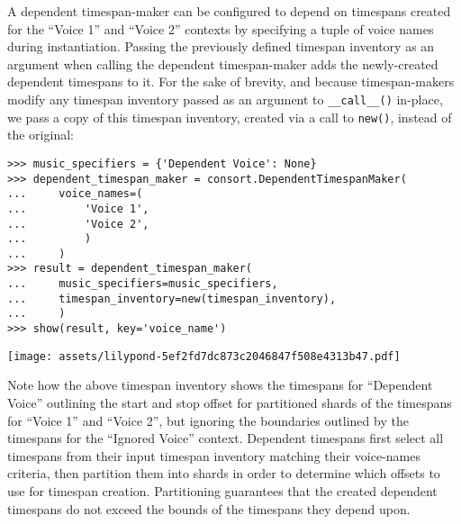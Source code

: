 \noindent A dependent timespan-maker can be configured to depend on timespans
created for the \enquote{Voice 1} and \enquote{Voice 2} contexts by specifying
a tuple of voice names during instantiation. Passing the previously defined
timespan inventory as an argument when calling the dependent timespan-maker
adds the newly-created dependent timespans to it. For the sake of brevity, and
because timespan-makers modify any timespan inventory passed as an argument to
\texttt{\_\_call\_\_()} in-place, we pass a copy of this timespan inventory,
created via a call to \texttt{new()}, instead of the original:

\begin{comment}
<abjad>
music_specifiers = {'Dependent Voice': None}
dependent_timespan_maker = consort.DependentTimespanMaker(
    voice_names=(
        'Voice 1',
        'Voice 2',
        )
    )
result = dependent_timespan_maker(
    music_specifiers=music_specifiers,
    timespan_inventory=new(timespan_inventory),
    )
show(result, key='voice_name')
</abjad>
\end{comment}

\begin{abjadbookoutput}
\begin{singlespacing}
\vspace{-0.5\baselineskip}
\begin{verbatim}
>>> music_specifiers = {'Dependent Voice': None}
>>> dependent_timespan_maker = consort.DependentTimespanMaker(
...     voice_names=(
...         'Voice 1',
...         'Voice 2',
...         )
...     )
>>> result = dependent_timespan_maker(
...     music_specifiers=music_specifiers,
...     timespan_inventory=new(timespan_inventory),
...     )
>>> show(result, key='voice_name')
\end{verbatim}
\noindent\texttt{[image: assets/lilypond-5ef2fd7dc873c2046847f508e4313b47.pdf]}
\end{singlespacing}
\end{abjadbookoutput}

\noindent Note how the above timespan inventory shows the timespans for
\enquote{Dependent Voice} outlining the start and stop offset for partitioned
shards of the timespans for \enquote{Voice 1} and \enquote{Voice 2}, but
ignoring the boundaries outlined by the timespans for the \enquote{Ignored
Voice} context. Dependent timespans first select all timespans from their input
timespan inventory matching their voice-names criteria, then partition them
into shards in order to determine which offsets to use for timespan creation.
Partitioning guarantees that the created dependent timespans do not exceed the
bounds of the timespans they depend upon.

